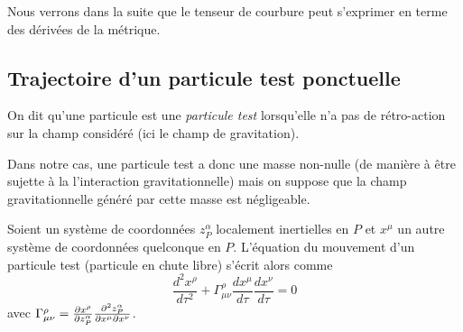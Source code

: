 \documentclass[a4paper,11pt]{report}
\begin{document}
            Nous verrons dans la suite que le tenseur de courbure peut s'exprimer en terme des dérivées de la métrique.
    
        \subsection{Trajectoire d'un particule test ponctuelle}
        
            \begin{defn}
                On dit qu'une particule est une \textit{particule test} lorsqu'elle n'a pas de rétro-action sur la champ considéré (ici le champ de gravitation).
            \end{defn}
            
            Dans notre cas, une particule test a donc une masse non-nulle (de manière à être sujette à la l'interaction gravitationnelle) mais on suppose que la champ gravitationnelle généré par cette masse est négligeable.
            
            \begin{prop}\begin{leftbar}
                Soient un système de coordonnées $z^\alpha_P$ localement inertielles en $P$ et $x^\mu$ un autre système de coordonnées quelconque en $P$. L'équation du mouvement d'un particule test (particule en chute libre) s'écrit alors comme
                \begin{equation}
                    \frac{d^2x^\rho}{d\tau^2}+\Gamma^\rho_{\mu\nu}\frac{dx^\mu}{d\tau}\frac{dx^\nu}{d\tau} = 0
                \end{equation}
                avec $\Gamma^\rho_{\mu\nu} = \frac{\partial x^\rho}{\partial z^\alpha_P}\frac{\partial^2 z^\alpha_P}{\partial x^\mu\partial x^\nu}$.
            \end{leftbar}\end{prop}
            
\end{document}
